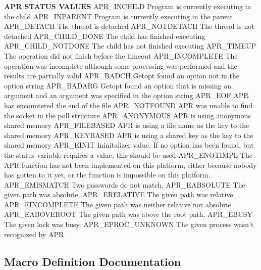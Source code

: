 \begin{DoxyPre}
{\bfseries APR STATUS VALUES}
APR\_INCHILD        Program is currently executing in the child
APR\_INPARENT       Program is currently executing in the parent
APR\_DETACH         The thread is detached
APR\_NOTDETACH      The thread is not detached
APR\_CHILD\_DONE     The child has finished executing
APR\_CHILD\_NOTDONE  The child has not finished executing
APR\_TIMEUP         The operation did not finish before the timeout
APR\_INCOMPLETE     The operation was incomplete although some processing
                   was performed and the results are partially valid
APR\_BADCH          Getopt found an option not in the option string
APR\_BADARG         Getopt found an option that is missing an argument
                   and an argument was specified in the option string
APR\_EOF            APR has encountered the end of the file
APR\_NOTFOUND       APR was unable to find the socket in the poll structure
APR\_ANONYMOUS      APR is using anonymous shared memory
APR\_FILEBASED      APR is using a file name as the key to the shared memory
APR\_KEYBASED       APR is using a shared key as the key to the shared memory
APR\_EINIT          Ininitalizer value.  If no option has been found, but
                   the status variable requires a value, this should be used
APR\_ENOTIMPL       The APR function has not been implemented on this
                   platform, either because nobody has gotten to it yet,
                   or the function is impossible on this platform.
APR\_EMISMATCH      Two passwords do not match.
APR\_EABSOLUTE      The given path was absolute.
APR\_ERELATIVE      The given path was relative.
APR\_EINCOMPLETE    The given path was neither relative nor absolute.
APR\_EABOVEROOT     The given path was above the root path.
APR\_EBUSY          The given lock was busy.
APR\_EPROC\_UNKNOWN  The given process wasn't recognized by APR
\end{DoxyPre}
 

\subsection{Macro Definition Documentation}
\mbox{\label{group___a_p_r___error_ga738a229b0c27bd96ae0173fecab251b7}} 
